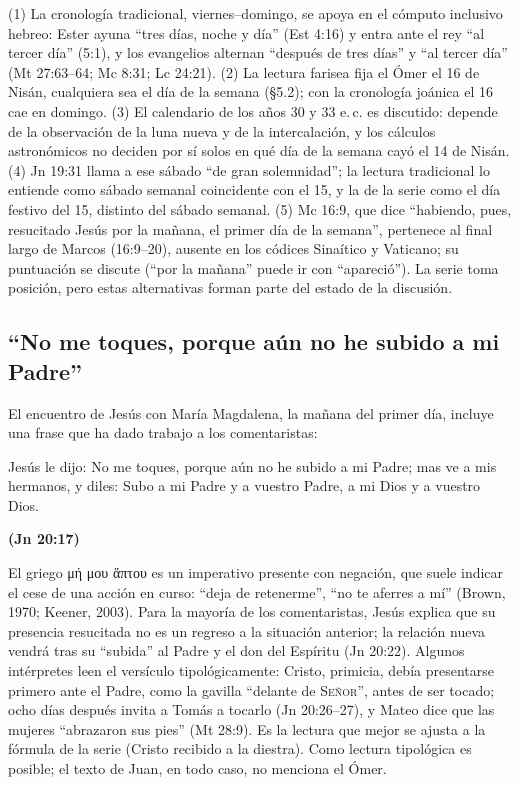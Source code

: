 \documentclass[11pt,letterpaper]{article}
\newcommand{\grc}[1]{\foreignlanguage{ancientgreek}{#1}}
\newcommand{\SENOR}{\textsc{Señor}}
\newcommand{\fuente}[1]{\par\hfill{\upshape\bfseries\small\textcolor{tierraroja}{#1}}}
\begin{document}
\begin{nota}
(1) La cronología tradicional, viernes--domingo, se apoya en el cómputo inclusivo hebreo: Ester ayuna ``tres días, noche y día'' (Est 4:16) y entra ante el rey ``al tercer día'' (5:1), y los evangelios alternan ``después de tres días'' y ``al tercer día'' (Mt 27:63--64; Mc 8:31; Lc 24:21). (2) La lectura farisea fija el Ómer el 16 de Nisán, cualquiera sea el día de la semana (§5.2); con la cronología joánica el 16 cae en domingo. (3) El calendario de los años 30 y 33 e.\,c. es discutido: depende de la observación de la luna nueva y de la intercalación, y los cálculos astronómicos no deciden por sí solos en qué día de la semana cayó el 14 de Nisán. (4) Jn 19:31 llama a ese sábado ``de gran solemnidad''; la lectura tradicional lo entiende como sábado semanal coincidente con el 15, y la de la serie como el día festivo del 15, distinto del sábado semanal. (5) Mc 16:9, que dice ``habiendo, pues, resucitado Jesús por la mañana, el primer día de la semana'', pertenece al final largo de Marcos (16:9--20), ausente en los códices Sinaítico y Vaticano; su puntuación se discute (``por la mañana'' puede ir con ``apareció''). La serie toma posición, pero estas alternativas forman parte del estado de la discusión.
\end{nota}

\subsection{``No me toques, porque aún no he subido a mi Padre''}
El encuentro de Jesús con María Magdalena, la mañana del primer día, incluye una frase que ha dado trabajo a los comentaristas:

\begin{cita}Jesús le dijo: No me toques, porque aún no he subido a mi Padre; mas ve a mis hermanos, y diles: Subo a mi Padre y a vuestro Padre, a mi Dios y a vuestro Dios.\fuente{(Jn 20:17)}\end{cita}

El griego \grc{μή μου ἅπτου} es un imperativo presente con negación, que suele indicar el cese de una acción en curso: ``deja de retenerme'', ``no te aferres a mí'' (Brown, 1970; Keener, 2003). Para la mayoría de los comentaristas, Jesús explica que su presencia resucitada no es un regreso a la situación anterior; la relación nueva vendrá tras su ``subida'' al Padre y el don del Espíritu (Jn 20:22). Algunos intérpretes leen el versículo tipológicamente: Cristo, primicia, debía presentarse primero ante el Padre, como la gavilla ``delante de \SENOR'', antes de ser tocado; ocho días después invita a Tomás a tocarlo (Jn 20:26--27), y Mateo dice que las mujeres ``abrazaron sus pies'' (Mt 28:9). Es la lectura que mejor se ajusta a la fórmula de la serie (Cristo recibido a la diestra). Como lectura tipológica es posible; el texto de Juan, en todo caso, no menciona el Ómer.
\end{document}
